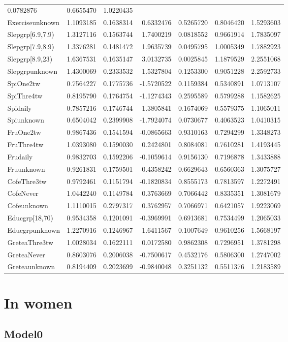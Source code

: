\documentclass[]{article}
\begin{document}
\begin{longtable}[]{@{}lrrrrrr@{}}
0.0782876 & 0.6655470 & 1.0220435\tabularnewline
Exerciseunknown & 1.1093185 & 0.1638314 & 0.6332476 & 0.5265720 &
0.8046420 & 1.5293603\tabularnewline
Slepgrp{[}6.9,7.9) & 1.3127116 & 0.1563744 & 1.7400219 & 0.0818552 &
0.9661914 & 1.7835097\tabularnewline
Slepgrp{[}7.9,8.9) & 1.3376281 & 0.1481472 & 1.9635739 & 0.0495795 &
1.0005349 & 1.7882923\tabularnewline
Slepgrp{[}8.9,23) & 1.6367531 & 0.1635147 & 3.0132735 & 0.0025845 &
1.1879529 & 2.2551068\tabularnewline
Slepgrpunknown & 1.4300069 & 0.2333532 & 1.5327804 & 0.1253300 &
0.9051228 & 2.2592733\tabularnewline
SpiOne2tw & 0.7564227 & 0.1775736 & -1.5720522 & 0.1159384 & 0.5340891 &
1.0713107\tabularnewline
SpiThre4tw & 0.8195790 & 0.1764754 & -1.1274343 & 0.2595589 & 0.5799288
& 1.1582625\tabularnewline
Spidaily & 0.7857216 & 0.1746744 & -1.3805841 & 0.1674069 & 0.5579375 &
1.1065011\tabularnewline
Spiunknown & 0.6504042 & 0.2399908 & -1.7924074 & 0.0730677 & 0.4063523
& 1.0410315\tabularnewline
FruOne2tw & 0.9867436 & 0.1541594 & -0.0865663 & 0.9310163 & 0.7294299 &
1.3348273\tabularnewline
FruThre4tw & 1.0393080 & 0.1590030 & 0.2424801 & 0.8084081 & 0.7610281 &
1.4193445\tabularnewline
Frudaily & 0.9832703 & 0.1592206 & -0.1059614 & 0.9156130 & 0.7196878 &
1.3433888\tabularnewline
Fruunknown & 0.9261831 & 0.1759501 & -0.4358242 & 0.6629643 & 0.6560363
& 1.3075727\tabularnewline
CofeThre3tw & 0.9792461 & 0.1151794 & -0.1820834 & 0.8555173 & 0.7813597
& 1.2272491\tabularnewline
CofeNever & 1.0442240 & 0.1149784 & 0.3763669 & 0.7066442 & 0.8335351 &
1.3081679\tabularnewline
Cofeunknown & 1.1110015 & 0.2797317 & 0.3762957 & 0.7066971 & 0.6421057
& 1.9223069\tabularnewline
Educgrp{[}18,70) & 0.9534358 & 0.1201091 & -0.3969991 & 0.6913681 &
0.7534499 & 1.2065033\tabularnewline
Educgrpunknown & 1.2270916 & 0.1246967 & 1.6411567 & 0.1007649 &
0.9610256 & 1.5668197\tabularnewline
GreteaThre3tw & 1.0028034 & 0.1622111 & 0.0172580 & 0.9862308 &
0.7296951 & 1.3781298\tabularnewline
GreteaNever & 0.8603076 & 0.2006038 & -0.7500617 & 0.4532176 & 0.5806300
& 1.2747002\tabularnewline
Greteaunknown & 0.8194409 & 0.2023699 & -0.9840048 & 0.3251132 &
0.5511376 & 1.2183589\tabularnewline
\bottomrule
\end{longtable}

\hypertarget{in-women-2}{%
\section{In women}\label{in-women-2}}

\hypertarget{model0-5}{%
\subsection{Model0}\label{model0-5}}
\end{document}
